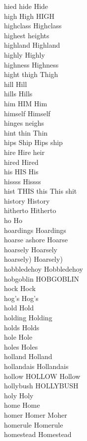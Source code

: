 hied hide Hide\\
high High HIGH\\
highclass Highclass\\
highest heights\\
highland Highland\\
highly Highly\\
highness Highness\\
hight thigh Thigh\\
hill Hill\\
hills Hills\\
him HIM Him\\
himself Himself\\
hinges neighs\\
hint thin Thin\\
hips Ship Hips ship\\
hire Hire heir\\
hired Hired\\
his HIS His\\
hissss Hissss\\
hist THIS this This shit\\
history History\\
hitherto Hitherto\\
ho Ho\\
hoardings Hoardings\\
hoarse ashore Hoarse\\
hoarsely Hoarsely\\
hoarsely) Hoarsely)\\
hobbledehoy Hobbledehoy\\
hobgoblin HOBGOBLIN\\
hock Hock\\
hog's Hog's\\
hold Hold\\
holding Holding\\
holds Holds\\
hole Hole\\
holes Holes\\
holland Holland\\
hollandais Hollandais\\
hollow HOLLOW Hollow\\
hollybush HOLLYBUSH\\
holy Holy\\
home Home\\
homer Homer Moher\\
homerule Homerule\\
homestead Homestead\\
